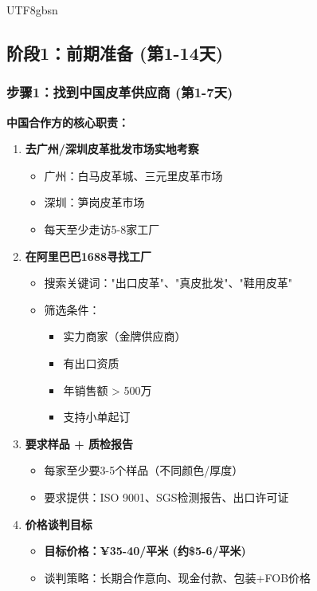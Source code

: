 \documentclass[12pt,a4paper]{article}
\begin{document}
\begin{CJK}{UTF8}{gbsn}

\subsection{阶段1：前期准备 (第1-14天)}

\subsubsection{步骤1：找到中国皮革供应商 (第1-7天)}

\textbf{中国合作方的核心职责：}

\begin{enumerate}
    \item \textbf{去广州/深圳皮革批发市场实地考察}
    \begin{itemize}
        \item 广州：白马皮革城、三元里皮革市场
        \item 深圳：笋岗皮革市场
        \item 每天至少走访5-8家工厂
    \end{itemize}
    
    \item \textbf{在阿里巴巴1688寻找工厂}
    \begin{itemize}
        \item 搜索关键词："出口皮革"、"真皮批发"、"鞋用皮革"
        \item 筛选条件：
        \begin{itemize}
            \item 实力商家（金牌供应商）
            \item 有出口资质
            \item 年销售额 > 500万
            \item 支持小单起订
        \end{itemize}
    \end{itemize}
    
    \item \textbf{要求样品 + 质检报告}
    \begin{itemize}
        \item 每家至少要3-5个样品（不同颜色/厚度）
        \item 要求提供：ISO 9001、SGS检测报告、出口许可证
    \end{itemize}
    
    \item \textbf{价格谈判目标}
    \begin{itemize}
        \item \textbf{目标价格：¥35-40/平米 (约\$5-6/平米)}
        \item 谈判策略：长期合作意向、现金付款、包装+FOB价格
    \end{itemize}
\end{enumerate}


\end{CJK}
\end{document}
